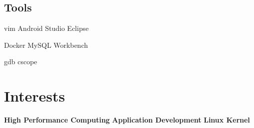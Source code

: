 \documentclass[letterpaper]{deedy-resume} %
\begin{document}
\begin{minipage}[t]{0.33\textwidth}
				 \sectionspace %

				 \subsection{Tools}
				 vim \textbullet{} Android Studio \textbullet{} Eclipse

				 Docker \textbullet{} MySQL Workbench

				 gdb \textbullet{} cscope

				 \sectionspace %

				 \section{Interests}
				 \textbullet{} \textbf{High Performance Computing} \textbullet{} \textbf{Application Development} \textbullet{} \textbf{Linux Kernel}


				 \end{minipage} %
				 \hfill
\end{document}
